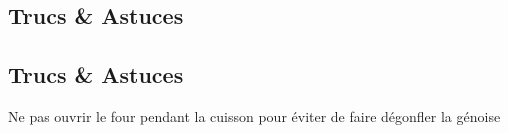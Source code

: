     \vspace{1cm}
    \hline
    \vspace{1cm}
    
    \subsection{Trucs \& Astuces}
        \subsection{Trucs \& Astuces}
	Ne pas ouvrir le four pendant la cuisson pour éviter de faire dégonfler la génoise
